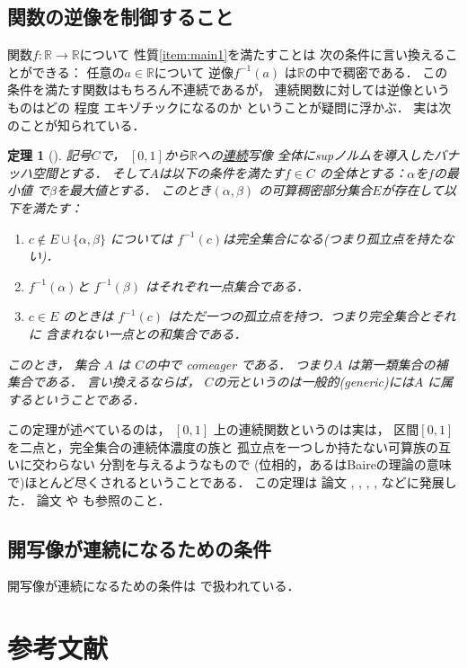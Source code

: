 \documentclass[leqno, a4paper, 12pt]{jsarticle}
\newtheorem{thm}{定理}
\theoremstyle{definition}
\newcommand{\rr}{\mathbb{R}}
\begin{document}
\subsection{関数の逆像を制御すること}
関数$f\colon \rr\to\rr$について
性質\ref{item:main1}を満たすことは
次の条件に言い換えることができる：
任意の$a\in \rr$について
逆像$f^{-1}(a)$
は$\rr$の中で稠密である．
この条件を満たす関数はもちろん不連続であるが，
連続関数に対しては逆像というものはどの
程度
エキゾチックになるのか
ということが疑問に浮かぶ．
実は次のことが知られている．
\begin{thm}[]
記号$C$で，
$[0, 1]$から$\rr$への\underline{連続}写像
全体にsupノルムを導入したバナッハ空間とする．
そして$A$は以下の条件を満たす$f\in C$
の全体とする：$\alpha$を$f$の最小値
で$\beta$を最大値とする．
このとき$(\alpha, \beta)$
の可算稠密部分集合$E$が存在して以下を満たす：
\begin{enumerate}[label=\textup{(\arabic*)}]
\item 
$c\not \in E\cup \{\alpha, \beta\}$
については
$f^{-1}(c)$は完全集合になる(つまり孤立点を持たない)．
\item
$f^{-1}(\alpha)$と
$f^{-1}(\beta)$
はそれぞれ一点集合である．
\item 
$c\in E$
のときは
$f^{-1}(c)$
はただ一つの孤立点を持つ．つまり完全集合とそれに
含まれない一点との和集合である．

\end{enumerate}
このとき，
集合
$A$
は
$C$の中で
comeager である．
つまり$A$
は第一類集合の補集合である．
言い換えるならば，
$C$の元というのは一般的(generic)には$A$
に属するということである．
\end{thm}
この定理が述べているのは，
$[0, 1]$
上の連続関数というのは実は，
区間$[0, 1]$
を二点と，完全集合の連続体濃度の族と
孤立点を一つしか持たない可算族の互いに交わらない
分割を与えるようなもので
(位相的，あるはBaireの理論の意味で)ほとんど尽くされるということである．
この定理は
論文
\cite{MR1260171}, 
\cite{MR3709302}, 
\cite{MR2317072},
\cite{MR3190768}, 
\cite{MR3076817}
などに発展した．
論文
\cite{MR0396870}や
\cite{MR0367124}
も参照のこと．


\subsection{開写像が連続になるための条件}
開写像が連続になるための条件は
\cite{MR0292041}
で扱われている．


\section*{参考文献}
\end{document}
